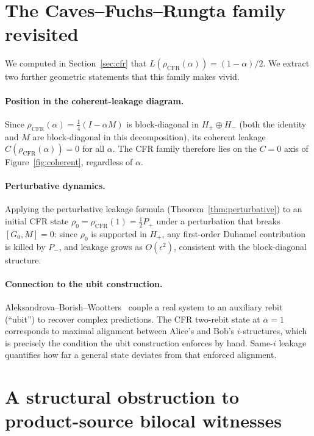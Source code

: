 \documentclass[a4paper,onecolumn,noarxiv]{quantumarticle}
\theoremstyle{plain}
\theoremstyle{definition}
\theoremstyle{remark}
\newcommand{\Pplus}{P_{+}}
\newcommand{\Pminus}{P_{-}}
\newcommand{\Hplus}{H_{+}}
\newcommand{\Hminus}{H_{-}}
\newcommand{\Mop}{M}
\newcommand{\Lleak}{L}
\begin{document}
\section{The Caves--Fuchs--Rungta family revisited}
\label{sec:cfr-revisit}

We computed in Section~\ref{sec:cfr} that $\Lleak(\rho_{\mathrm{CFR}}(\alpha))=(1-\alpha)/2$.
We extract two further geometric statements that this family makes vivid.

\paragraph{Position in the coherent-leakage diagram.} Since
$\rho_{\mathrm{CFR}}(\alpha)=\tfrac{1}{4}(I-\alpha\Mop)$ is block-diagonal in
$\Hplus\oplus\Hminus$ (both the identity and $\Mop$ are block-diagonal in this
decomposition), its coherent leakage $C(\rho_{\mathrm{CFR}}(\alpha))=0$ for all
$\alpha$. The CFR family therefore lies on the $C=0$ axis of Figure~\ref{fig:coherent},
regardless of $\alpha$.

\paragraph{Perturbative dynamics.} Applying the perturbative leakage formula
(Theorem~\ref{thm:perturbative}) to an initial CFR state $\rho_0=\rho_{\mathrm{CFR}}(1)
=\tfrac{1}{2}\Pplus$ under a perturbation that breaks $[G_0,\Mop]=0$: since
$\rho_0$ is supported in $\Hplus$, any first-order Duhamel contribution is killed by
$\Pminus$, and leakage grows as $O(\epsilon^2)$, consistent with the block-diagonal
structure.

\paragraph{Connection to the ubit construction.} Aleksandrova--Borish--Wootters~%
\cite{AleksandrovaBorishWootters2013} couple a real system to an auxiliary rebit
(``ubit'') to recover complex predictions. The CFR two-rebit state at $\alpha=1$
corresponds to maximal alignment between Alice's and Bob's $i$-structures, which is
precisely the condition the ubit construction enforces by hand. Same-$i$ leakage
quantifies how far a general state deviates from that enforced alignment.

\section{A structural obstruction to product-source bilocal witnesses}
\label{sec:bobnode}
\end{document}
